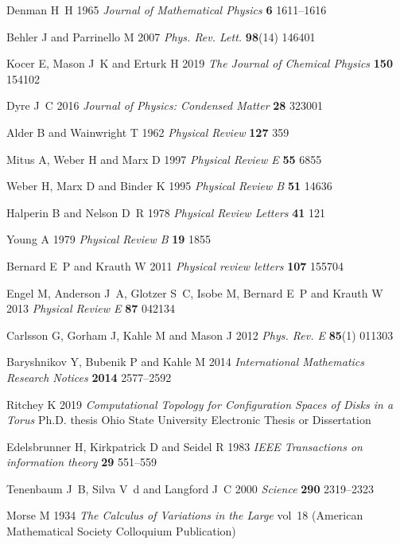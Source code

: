 \documentclass[default,iicol]{sn-jnl}%
\theoremstyle{thmstyleone}%
\theoremstyle{thmstyletwo}%
\theoremstyle{thmstylethree}%
\begin{document}
\begin{thebibliography}{10}
	Denman H~H 1965 {\em Journal of Mathematical Physics\/} {\bf 6} 1611–1616
	
	Behler J and Parrinello M 2007 {\em Phys. Rev. Lett.\/} {\bf 98}(14) 146401
	
	Kocer E, Mason J~K and Erturk H 2019 {\em The Journal of Chemical Physics\/}
	{\bf 150} 154102
	
	Dyre J~C 2016 {\em Journal of Physics: Condensed Matter\/} {\bf 28} 323001
	
	Alder B and Wainwright T 1962 {\em Physical Review\/} {\bf 127} 359
	
	Mitus A, Weber H and Marx D 1997 {\em Physical Review E\/} {\bf 55} 6855
	
	Weber H, Marx D and Binder K 1995 {\em Physical Review B\/} {\bf 51} 14636
	
	Halperin B and Nelson D~R 1978 {\em Physical Review Letters\/} {\bf 41} 121
	
	Young A 1979 {\em Physical Review B\/} {\bf 19} 1855
	
	Bernard E~P and Krauth W 2011 {\em Physical review letters\/} {\bf 107} 155704
	
	Engel M, Anderson J~A, Glotzer S~C, Isobe M, Bernard E~P and Krauth W 2013 {\em
		Physical Review E\/} {\bf 87} 042134
	
	Carlsson G, Gorham J, Kahle M and Mason J 2012 {\em Phys. Rev. E\/} {\bf 85}(1)
	011303
	
	Baryshnikov Y, Bubenik P and Kahle M 2014 {\em International Mathematics
		Research Notices\/} {\bf 2014} 2577–2592
	
	Ritchey K 2019 {\em Computational Topology for Configuration Spaces of Disks in
		a Torus\/} Ph.D. thesis Ohio State University Electronic Thesis or
	Dissertation
	
	Edelsbrunner H, Kirkpatrick D and Seidel R 1983 {\em IEEE Transactions on
		information theory\/} {\bf 29} 551–559
	
	Tenenbaum J~B, Silva V~d and Langford J~C 2000 {\em Science\/} {\bf 290}
	2319–2323
	
	Morse M 1934 {\em The Calculus of Variations in the Large\/} vol~18 (American
	Mathematical Society Colloquium Publication)
	

\end{thebibliography}
\end{document}
